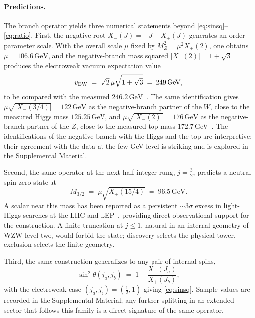 \documentclass[aps,prl,twocolumn,superscriptaddress,floatfix,nofootinbib,reprint]{revtex4-2}
\newcommand{\Xp}{X_{+}}
\newcommand{\Xm}{X_{-}}
\newcommand{\half}{\tfrac12}
\begin{document}

\paragraph{Predictions.}
The branch operator yields three numerical statements beyond
\eqref{eq:sinsq}--\eqref{eq:ratio}.  First, the negative root
$\Xm(J)=-J-\Xp(J)$ generates an order-parameter scale.  With the
overall scale $\mu$ fixed by $M_{Z}^{2}=\mu^{2}\Xp(2)$, one obtains
$\mu=106.6\,\text{GeV}$, and the negative-branch mass squared
$|\Xm(2)|=1+\sqrt 3$ produces the electroweak vacuum expectation value
\begin{equation}
  v_{\rm EW}\;=\;\sqrt{2}\,\mu\sqrt{1+\sqrt 3}\;=\;249\,\text{GeV},
\label{eq:vEW}
\end{equation}
to be compared with the measured $246.2\,\text{GeV}$~\cite{PDG2024}.
The same identification gives $\mu\sqrt{|\Xm(3/4)|}=122\,\text{GeV}$ as
the negative-branch partner of the $W$, close to the measured Higgs
mass $125.25\,\text{GeV}$, and $\mu\sqrt{|\Xm(2)|}=176\,\text{GeV}$ as
the negative-branch partner of the $Z$, close to the measured top mass
$172.7\,\text{GeV}$~\cite{PDG2024}.  The identifications of the
negative branch with the Higgs and the top are interpretive; their
agreement with the data at the few-GeV level is striking and is
explored in the Supplemental Material.

Second, the same operator at the next half-integer rung, $j=\tfrac32$,
predicts a neutral spin-zero state at
\begin{equation}
  M_{3/2}\;=\;\mu\sqrt{\Xp(15/4)}\;=\;96.5\,\text{GeV}.
\label{eq:96}
\end{equation}
A scalar near this mass has been reported as a persistent
$\sim$3$\sigma$ excess in light-Higgs searches at the LHC and
LEP~\cite{CMS96,Heinemeyer2019}, providing direct observational
support for the construction.  A finite truncation at $j\le 1$,
natural in an internal geometry of WZW level two, would forbid the
state; discovery selects the physical tower, exclusion selects the
finite geometry.

Third, the same construction generalizes to any pair of internal
spins,
\begin{equation}
  \sin^{2}\theta(j_{a},j_{b})\;=\;1-\frac{\Xp(J_{a})}{\Xp(J_{b})},
\label{eq:tower}
\end{equation}
with the electroweak case $(j_{a},j_{b})=(\half,1)$ giving \eqref{eq:sinsq}.
Sample values are recorded in the Supplemental Material; any further
splitting in an extended sector that follows this family is a direct
signature of the same operator.
\end{document}
